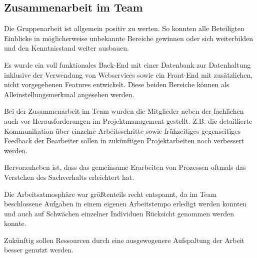 \subsection{Zusammenarbeit im Team}

Die Gruppenarbeit ist allgemein positiv zu werten. 
So konnten alle Beteiligten Einblicke in möglicherweise unbekannte Bereiche gewinnen oder sich weiterbilden und den Kenntnisstand weiter ausbauen.

Es wurde ein voll funktionales Back-End mit einer Datenbank zur Datenhaltung inklusive der Verwendung von Webservices sowie ein Front-End mit zusätzlichen, nicht vorgegebenen Features entwickelt. Diese beiden Bereiche können als Alleinstellungsmerkmal angesehen werden.

Bei der Zusammenarbeit im Team wurden die Mitglieder neben der fachlichen auch vor Herausforderungen im Projektmanagement gestellt. Z.B. die detaillierte Kommunikation über einzelne Arbeitsschritte sowie frühzeitiges gegenseitiges Feedback der Bearbeiter sollen in zukünftigen Projektarbeiten noch verbessert werden.

Hervorzuheben ist, dass das gemeinsame Erarbeiten von Prozessen oftmals das Verstehen des Sachverhalts erleichtert hat.

Die Arbeitsatmosphäre war größtenteils recht entspannt, da im Team beschlossene Aufgaben in einem eigenen Arbeitstempo erledigt werden konnten und auch auf Schwächen einzelner Individuen Rücksicht genommen werden konnte.

Zukünftig sollen Ressourcen durch eine ausgewogenere Aufspaltung der Arbeit besser genutzt werden.

